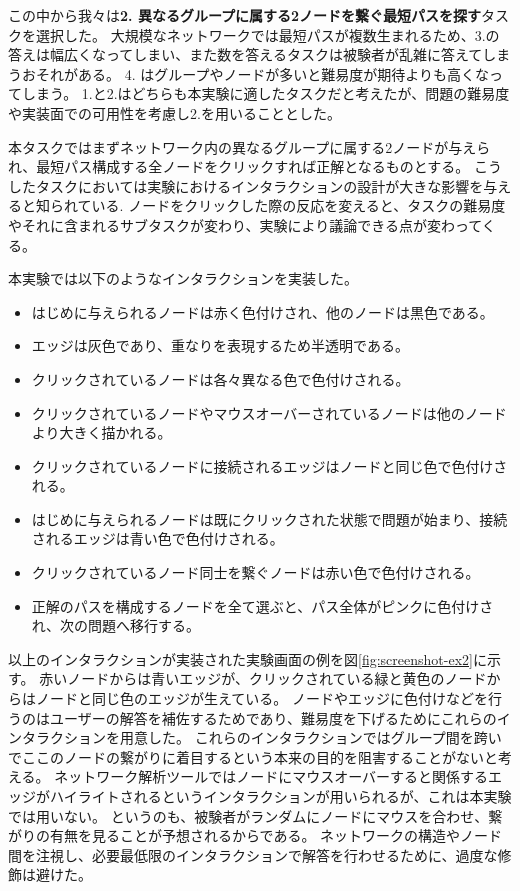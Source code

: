 \documentclass{kuee}
\begin{document}
この中から我々は{\bf 2. 異なるグループに属する2ノードを繋ぐ最短パスを探す}タスクを選択した。
大規模なネットワークでは最短パスが複数生まれるため、3.の答えは幅広くなってしまい、また数を答えるタスクは被験者が乱雑に答えてしまうおそれがある。
4. はグループやノードが多いと難易度が期待よりも高くなってしまう。
1.と2.はどちらも本実験に適したタスクだと考えたが、問題の難易度や実装面での可用性を考慮し2.を用いることとした。

本タスクではまずネットワーク内の異なるグループに属する2ノードが与えられ、最短パス構成する全ノードをクリックすれば正解となるものとする。
こうしたタスクにおいては実験におけるインタラクションの設計が大きな影響を与えると知られている\cite{yoghourdjian2018exploring}.
ノードをクリックした際の反応を変えると、タスクの難易度やそれに含まれるサブタスクが変わり、実験により議論できる点が変わってくる。

本実験では以下のようなインタラクションを実装した。
\begin{itemize}
  \item はじめに与えられるノードは赤く色付けされ、他のノードは黒色である。
  \item エッジは灰色であり、重なりを表現するため半透明である。
  \item クリックされているノードは各々異なる色で色付けされる。
  \item クリックされているノードやマウスオーバーされているノードは他のノードより大きく描かれる。
  \item クリックされているノードに接続されるエッジはノードと同じ色で色付けされる。
  \item はじめに与えられるノードは既にクリックされた状態で問題が始まり、接続されるエッジは青い色で色付けされる。
  \item クリックされているノード同士を繋ぐノードは赤い色で色付けされる。
  \item 正解のパスを構成するノードを全て選ぶと、パス全体がピンクに色付けされ、次の問題へ移行する。
\end{itemize}
以上のインタラクションが実装された実験画面の例を図\ref{fig:screenshot-ex2}に示す。
赤いノードからは青いエッジが、クリックされている緑と黄色のノードからはノードと同じ色のエッジが生えている。
ノードやエッジに色付けなどを行うのはユーザーの解答を補佐するためであり、難易度を下げるためにこれらのインタラクションを用意した。
これらのインタラクションではグループ間を跨いでここのノードの繋がりに着目するという本来の目的を阻害することがないと考える。
ネットワーク解析ツールではノードにマウスオーバーすると関係するエッジがハイライトされるというインタラクションが用いられるが、これは本実験では用いない。
というのも、被験者がランダムにノードにマウスを合わせ、繋がりの有無を見ることが予想されるからである。
ネットワークの構造やノード間を注視し、必要最低限のインタラクションで解答を行わせるために、過度な修飾は避けた。
\end{document}
